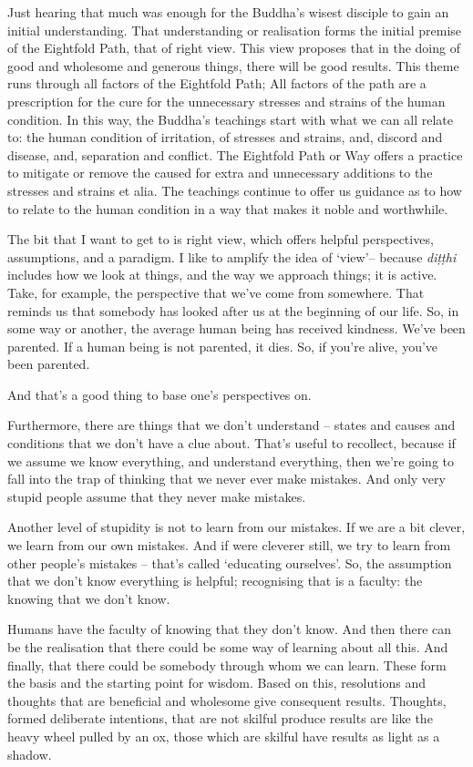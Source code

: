 Just hearing that much was enough for the Buddha's wisest disciple to gain an
initial understanding. That understanding or realisation forms the initial
premise of the Eightfold Path, that of right view. This view proposes that in
the doing of good and wholesome and generous things, there will be good results.
This theme runs through all factors of the Eightfold Path; All factors of the
path are a prescription for the cure for the unnecessary stresses and strains of
the human condition. In this way, the Buddha's teachings start with what we can
all relate to: the human condition of irritation, of stresses and strains, and,
discord and disease, and, separation and conflict. The Eightfold Path or Way
offers a practice to mitigate or remove the caused for extra and unnecessary
additions to the stresses and strains et alia. The teachings continue to offer
us guidance as to how to relate to the human condition in a way that makes it
noble and worthwhile.

The bit that I want to get to is right view, which offers helpful perspectives,
assumptions, and a paradigm. I like to amplify the idea of `view'-- because
\emph{diṭṭhi} includes how we look at things, and the way we approach things; it
is active. Take, for example, the perspective that we've come from somewhere.
That reminds us that somebody has looked after us at the beginning of our life.
So, in some way or another, the average human being has received kindness. We've
been parented. If a human being is not parented, it dies. So, if you're alive,
you've been parented.

And that's a good thing to base one's perspectives on.

Furthermore, there are things that we don't understand -- states and causes and
conditions that we don't have a clue about. That's useful to recollect, because
if we assume we know everything, and understand everything, then we're going to
fall into the trap of thinking that we never ever make mistakes. And only very
stupid people assume that they never make mistakes.

Another level of stupidity is not to learn from our mistakes. If we are a bit
clever, we learn from our own mistakes. And if were cleverer still, we try to
learn from other people's mistakes -- that's called `educating ourselves'. So,
the assumption that we don't know everything is helpful; recognising that is a
faculty: the knowing that we don't know.

Humans have the faculty of knowing that they don't know. And then there can be
the realisation that there could be some way of learning about all this. And
finally, that there could be somebody through whom we can learn. These form the
basis and the starting point for wisdom. Based on this, resolutions and thoughts
that are beneficial and wholesome give consequent results. Thoughts, formed
deliberate intentions, that are not skilful produce results are like the heavy
wheel pulled by an ox, those which are skilful have results as light as a
shadow.


